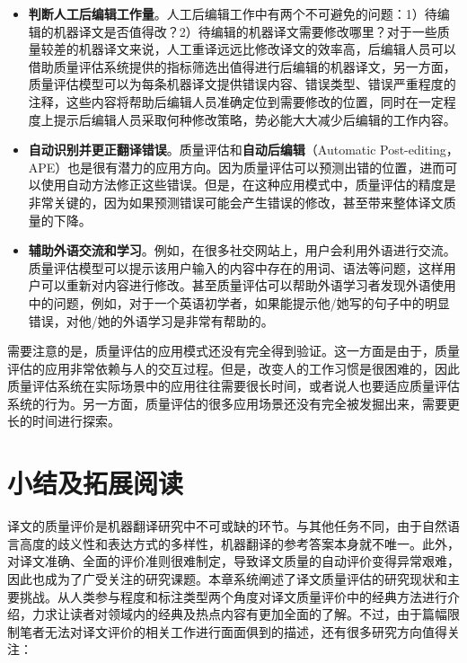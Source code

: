 \begin{itemize}
\vspace{0.5em}
\item {\small\sffamily\bfseries{判断人工后编辑工作量}}。人工后编辑工作中有两个不可避免的问题：1）待编辑的机器译文是否值得改？2）待编辑的机器译文需要修改哪里？对于一些质量较差的机器译文来说，人工重译远远比修改译文的效率高，后编辑人员可以借助质量评估系统提供的指标筛选出值得进行后编辑的机器译文，另一方面，质量评估模型可以为每条机器译文提供{错误内容、错误类型、错误严重程度}的注释，这些内容将帮助后编辑人员准确定位到需要修改的位置，同时在一定程度上提示后编辑人员采取何种修改策略，势必能大大减少后编辑的工作内容。
\vspace{0.5em}
\item {\small\sffamily\bfseries{自动识别并更正翻译错误}}。质量评估和{\small\sffamily\bfseries{自动后编辑}}（Automatic Post-editing，APE）也是很有潜力的应用方向。因为质量评估可以预测出错的位置，进而可以使用自动方法修正这些错误。但是，在这种应用模式中，质量评估的精度是非常关键的，因为如果预测错误可能会产生错误的修改，甚至带来整体译文质量的下降。
\vspace{0.5em}
\item {\small\sffamily\bfseries{辅助外语交流和学习}}。例如，在很多社交网站上，用户会利用外语进行交流。质量评估模型可以提示该用户输入的内容中存在的用词、语法等问题，这样用户可以重新对内容进行修改。甚至质量评估可以帮助外语学习者发现外语使用中的问题，例如，对于一个英语初学者，如果能提示他/她写的句子中的明显错误，对他/她的外语学习是非常有帮助的。
\vspace{0.5em}
\end{itemize}

\parinterval 需要注意的是，质量评估的应用模式还没有完全得到验证。这一方面是由于，质量评估的应用非常依赖与人的交互过程。但是，改变人的工作习惯是很困难的，因此质量评估系统在实际场景中的应用往往需要很长时间，或者说人也要适应质量评估系统的行为。另一方面，质量评估的很多应用场景还没有完全被发掘出来，需要更长的时间进行探索。


\sectionnewpage
\section{小结及拓展阅读}

\parinterval 译文的质量评价是机器翻译研究中不可或缺的环节。与其他任务不同，由于自然语言高度的歧义性和表达方式的多样性，机器翻译的参考答案本身就不唯一。此外，对译文准确、全面的评价准则很难制定，导致译文质量的自动评价变得异常艰难，因此也成为了广受关注的研究课题。本章系统阐述了译文质量评估的研究现状和主要挑战。从人类参与程度和标注类型两个角度对译文质量评价中的经典方法进行介绍，力求让读者对领域内的经典及热点内容有更加全面的了解。不过，由于篇幅限制笔者无法对译文评价的相关工作进行面面俱到的描述，还有很多研究方向值得关注：

